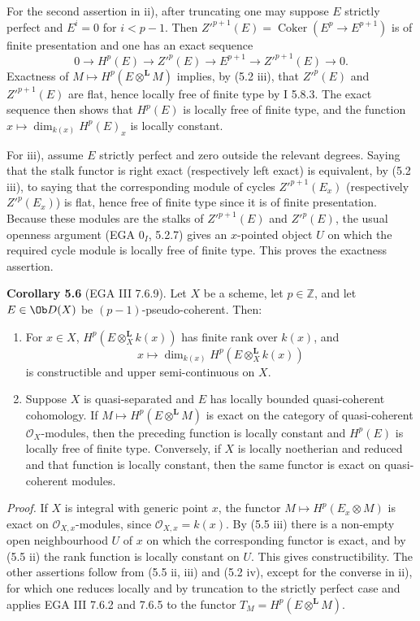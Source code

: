 \documentclass[11pt]{article}
\providecommand{\Coker}{\operatorname{Coker}}
\begin{document}
For the second assertion in ii), after truncating one may suppose \(E\) strictly perfect and \(E^i=0\) for \(i<p-1\). Then \(Z'^{p+1}(E)=\Coker(E^p\to E^{p+1})\) is of finite presentation and one has an exact sequence
\[
0\to H^p(E)\to Z'^p(E)\to E^{p+1}\to Z'^{p+1}(E)\to0.
\]
Exactness of \(M\mapsto H^p(E\otimes^{\mathbf L}M)\) implies, by (5.2 iii), that \(Z'^{p}(E)\) and \(Z'^{p+1}(E)\) are flat, hence locally free of finite type by I 5.8.3. The exact sequence then shows that \(H^p(E)\) is locally free of finite type, and the function \(x\mapsto\dim_{k(x)}H^p(E)_x\) is locally constant.

For iii), assume \(E\) strictly perfect and zero outside the relevant degrees. Saying that the stalk functor is right exact (respectively left exact) is equivalent, by (5.2 iii), to saying that the corresponding module of cycles \(Z'^{p+1}(E_x)\) (respectively \(Z'^p(E_x)\)) is flat, hence free of finite type since it is of finite presentation. Because these modules are the stalks of \(Z'^{p+1}(E)\) and \(Z'^p(E)\), the usual openness argument (EGA \(0_I\), 5.2.7) gives an \(x\)-pointed object \(U\) on which the required cycle module is locally free of finite type. This proves the exactness assertion.

\textbf{Corollary 5.6} (EGA III 7.6.9). Let \(X\) be a scheme, let \(p\in\mathbb Z\), and let \(E\in\Ob D(X)\) be \((p-1)\)-pseudo-coherent. Then:
\begin{enumerate}[label=\roman*)]
\item For \(x\in X\), \(H^p(E\otimes_X^{\mathbf L}k(x))\) has finite rank over \(k(x)\), and
\[
 x\longmapsto \dim_{k(x)}H^p(E\otimes_X^{\mathbf L}k(x))
\]
is constructible and upper semi-continuous on \(X\).
\item Suppose \(X\) is quasi-separated and \(E\) has locally bounded quasi-coherent cohomology. If \(M\mapsto H^p(E\otimes^{\mathbf L}M)\) is exact on the category of quasi-coherent \(\mathcal O_X\)-modules, then the preceding function is locally constant and \(H^p(E)\) is locally free of finite type. Conversely, if \(X\) is locally noetherian and reduced and that function is locally constant, then the same functor is exact on quasi-coherent modules.
\end{enumerate}

\emph{Proof.} If \(X\) is integral with generic point \(x\), the functor \(M\mapsto H^p(E_x\otimes M)\) is exact on \(\mathcal O_{X,x}\)-modules, since \(\mathcal O_{X,x}=k(x)\). By (5.5 iii) there is a non-empty open neighbourhood \(U\) of \(x\) on which the corresponding functor is exact, and by (5.5 ii) the rank function is locally constant on \(U\). This gives constructibility. The other assertions follow from (5.5 ii, iii) and (5.2 iv), except for the converse in ii), for which one reduces locally and by truncation to the strictly perfect case and applies EGA III 7.6.2 and 7.6.5 to the functor \(T_M=H^p(E\otimes^{\mathbf L}M)\).
\end{document}
